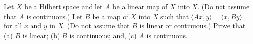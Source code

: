 Let $X$ be a Hilbert space and let $A$ be a linear map of $X$ into
$X$.  (Do not assume that $A$ is continuous.) Let $B$ be a map of $X$
into $X$ such that $\langle Ax,y \rangle=\langle x, By \rangle$ for
all $x$ and $y$ in $X$. (Do not assume that $B$ is linear or
continuous.) Prove that (a) $B$ is linear; (b) $B$ is continuous; and,
(c) $A$ is continuous. 
